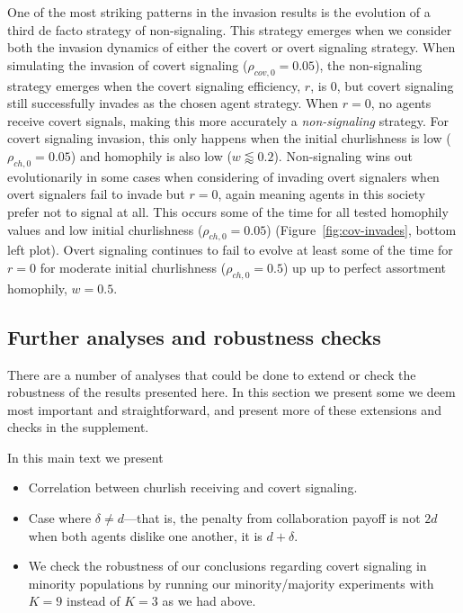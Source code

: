 \documentclass[11pt,letterpaper]{article}
\begin{document}
One of the most striking patterns in the invasion results is the evolution
of a third de facto strategy of non-signaling. This strategy emerges when
we consider both the invasion dynamics of either the covert or overt 
signaling strategy. When simulating the invasion of covert signaling
($\rho_{cov,0}=0.05$), the non-signaling strategy emerges when the covert
signaling efficiency, $r$, is 0, but covert signaling still successfully
invades as the chosen agent strategy. When $r=0$, no agents receive
covert signals, making this more accurately a \emph{non-signaling} strategy.  
For covert signaling invasion, this only happens when the initial churlishness
is low ($\rho_{ch,0}=0.05$) and homophily is also low ($w \lessapprox 0.2$). 
Non-signaling wins out evolutionarily 
in some cases when considering of invading overt signalers when overt signalers
fail to invade but $r=0$, again meaning agents in this society prefer not
to signal at all. This occurs some of the time for all tested homophily
values and low initial churlishness ($\rho_{ch,0}=0.05$) (Figure~\ref{fig:cov-invades}, bottom left plot).  
Overt signaling continues to fail to evolve at least some of the time
for $r=0$ for moderate initial churlishness ($\rho_{ch,0}=0.5$) up up to perfect 
assortment homophily, $w=0.5$.

\subsection{Further analyses and robustness checks}

There are a number of analyses that could be done to extend or check the 
robustness of the results presented here. In this section we present some
we deem most important and straightforward, and present more of these extensions
and checks in the supplement.

In this main text we present
\begin{itemize}
  \item Correlation between churlish receiving and covert signaling.
  \item Case where $\delta \neq d$---that is, the penalty from collaboration
    payoff is not $2d$ when both agents dislike one another, it is $d + \delta$.
  \item We check the robustness of our conclusions regarding covert signaling
    in minority populations by running our minority/majority
    experiments with $K=9$ instead of $K=3$ as we had above.
\end{itemize}
\end{document}
